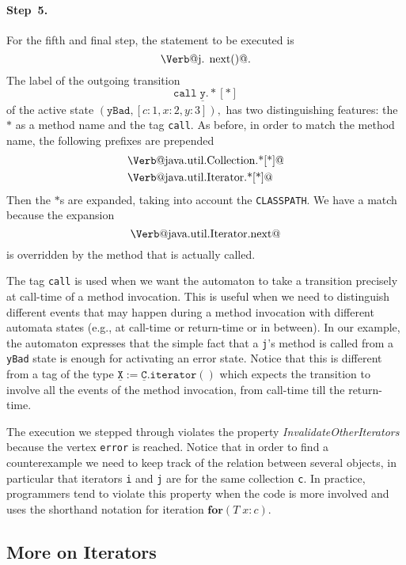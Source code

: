 \documentclass[preprint]{sigplanconf} %
\makeatletter
\newcommand{\pattern}[1]{\ensuremath{\mathtt{\underline{#1}}}}
\newcommand{\verbline}[2][]{\[\text{\Verb@#2@}#1\]}
\theoremstyle{definition}
\theoremstyle{remark}
\makeatother
\begin{document}
\paragraph{Step~5.}

For the fifth and final step, the statement to be executed is \verbline[.]{j.\PY{n+na}{next}()}
The label of the outgoing transition  \[\mathtt{call}\;\pattern{y}.{*}[*]\] of the active state $(\texttt{yBad},[c:1,x:2,y:3]),$
has two distinguishing features: the~$*$ as a method name and the tag \texttt{call}.
As before, in order to match the method name, the following prefixes are prepended  
\begin{align*}
&\text{\Verb@java.util.Collection.*[*]@} \\
&\text{\Verb@java.util.Iterator.*[*]@}
\end{align*}
Then the $*$s are expanded, taking into account the \texttt{CLASSPATH}.
We have a match because the expansion \verbline{java.util.Iterator.next} is overridden by the method that is actually called.

The tag {\tt call} is used when we want the automaton to take a transition precisely at call-time of a method invocation.
This is useful when we need to distinguish different events that may happen during a method invocation with different automata states (e.g., at call-time or return-time or in between).
In our example, the automaton expresses that the simple fact that a {\tt j}'s method is called from a {\tt yBad} state is enough for activating an error state. Notice that this is different from a tag of the type $\pattern X:=\pattern C.\mathtt{iterator}()$ which expects the transition to involve all the events of the method invocation, from call-time till the return-time.

\medskip
The execution we stepped through violates the property \textit{InvalidateOtherIterators} because the vertex \texttt{error} is reached.
Notice that in order to find a counterexample we need to keep track of the relation between several objects, in particular that iterators {\tt i} and {\tt j} are for the same collection {\tt c}.
In practice, programmers tend to violate this property when the code is more involved and uses the shorthand notation for iteration $\mathbf{for}(T\;x:c)$.

\subsection{More on Iterators} \label{sec:examples.iterators} %
\end{document}
